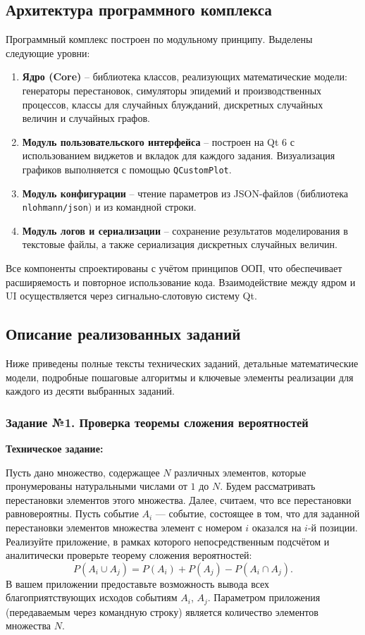 \documentclass[a4paper]{article}
\theoremstyle{definition}
\begin{document}
\subsection{Архитектура программного комплекса}

Программный комплекс построен по модульному принципу. Выделены следующие уровни:
\begin{enumerate}
    \item \textbf{Ядро (Core)} – библиотека классов, реализующих математические модели: генераторы перестановок, симуляторы эпидемий и производственных процессов, классы для случайных блужданий, дискретных случайных величин и случайных графов.
    \item \textbf{Модуль пользовательского интерфейса} – построен на Qt 6 с использованием виджетов и вкладок для каждого задания. Визуализация графиков выполняется с помощью \texttt{QCustomPlot}.
    \item \textbf{Модуль конфигурации} – чтение параметров из JSON-файлов (библиотека \texttt{nlohmann/json}) и из командной строки.
    \item \textbf{Модуль логов и сериализации} – сохранение результатов моделирования в текстовые файлы, а также сериализация дискретных случайных величин.
\end{enumerate}
Все компоненты спроектированы с учётом принципов ООП, что обеспечивает расширяемость и повторное использование кода. Взаимодействие между ядром и UI осуществляется через сигнально-слотовую систему Qt.

\subsection{Описание реализованных заданий}

Ниже приведены полные тексты технических заданий, детальные математические модели, подробные пошаговые алгоритмы и ключевые элементы реализации для каждого из десяти выбранных заданий.

\subsubsection{Задание №1. Проверка теоремы сложения вероятностей}

\textbf{Техническое задание:}

Пусть дано множество, содержащее $N$ различных элементов, которые пронумерованы натуральными числами от $1$ до $N$. Будем рассматривать перестановки элементов этого множества. Далее, считаем, что все перестановки равновероятны. Пусть событие $A_i$ — событие, состоящее в том, что для заданной перестановки элементов множества элемент с номером $i$ оказался на $i$-й позиции. Реализуйте приложение, в рамках которого непосредственным подсчётом и аналитически проверьте теорему сложения вероятностей:
\[
P(A_i \cup A_j) = P(A_i) + P(A_j) - P(A_i \cap A_j).
\]
В вашем приложении предоставьте возможность вывода всех благоприятствующих исходов событиям $A_i$, $A_j$. Параметром приложения (передаваемым через командную строку) является количество элементов множества $N$.
\end{document}
